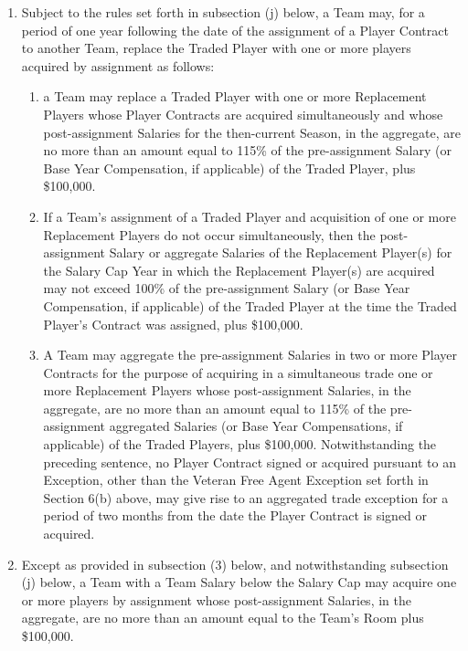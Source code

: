 \documentclass[
]{book}
\providecommand{\tightlist}{%
  \setlength{\itemsep}{0pt}\setlength{\parskip}{0pt}}
\begin{document}
\begin{enumerate}
  \begin{enumerate}
  \def\labelenumii{(\arabic{enumii})}
  \item
    Subject to the rules set forth in subsection (j) below, a Team may, for a period of one year following the date of the assignment of a Player Contract to another Team, replace the Traded Player with one or more players acquired by assignment as follows:

    \begin{enumerate}
    \def\labelenumiii{(\roman{enumiii})}
    \tightlist
    \item
      a Team may replace a Traded Player with one or more Replacement Players whose Player Contracts are acquired simultaneously and whose post-assignment Salaries for the then-current Season, in the aggregate, are no more than an amount equal to 115\% of the pre-assignment Salary (or Base Year Compensation, if applicable) of the Traded Player, plus \$100,000.
    \item
      If a Team's assignment of a Traded Player and acquisition of one or more Replacement Players do not occur simultaneously, then the post-assignment Salary or aggregate Salaries of the Replacement Player(s) for the Salary Cap Year in which the Replacement Player(s) are acquired may not exceed 100\% of the pre-assignment Salary (or Base Year Compensation, if applicable) of the Traded Player at the time the Traded Player's Contract was assigned, plus \$100,000.
    \item
      A Team may aggregate the pre-assignment Salaries in two or more Player Contracts for the purpose of acquiring in a simultaneous trade one or more Replacement Players whose post-assignment Salaries, in the aggregate, are no more than an amount equal to 115\% of the pre-assignment aggregated Salaries (or Base Year Compensations, if applicable) of the Traded Players, plus \$100,000. Notwithstanding the preceding sentence, no Player Contract signed or acquired pursuant to an Exception, other than the Veteran Free Agent Exception set forth in Section 6(b) above, may give rise to an aggregated trade exception for a period of two months from the date the Player Contract is signed or acquired.
    \end{enumerate}
  \item
    Except as provided in subsection (3) below, and notwithstanding subsection (j) below, a Team with a Team Salary below the Salary Cap may acquire one or more players by assignment whose post-assignment Salaries, in the aggregate, are no more than an amount equal to the Team's Room plus \$100,000.

\end{enumerate}
\end{enumerate}
\end{document}
